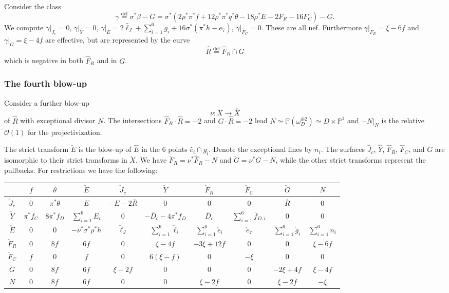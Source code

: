 \documentclass[12pt]{amsart}
\theoremstyle{definition}
\newcommand{\bb}{\ensuremath{\mathfrak{b}}}
\newcommand{\deq}{\ensuremath{\stackrel{\textrm{def}}{=}}}
\newcommand{\?}{ \circled{{\large\bf ?}}}
\let\cal\mathcal
\let\bb\mathbb
\begin{document}
Consider the class
\[\gamma\deq \sigma^*\beta-G= \sigma^*(2\rho^*\pi^*f+12\rho^*\pi^*q^*\theta-18\rho^*E-2F_R-16F_C)-G.\]
We compute $\gamma|_{\widehat J_c}=0$, $\gamma|_{\widehat Y}=0$, $\gamma|_{\widehat E}=2\widehat{\ell}_J+\sum_{i=1}^6g_i+16\sigma^*(\pi^*h-e_7)$, $\gamma|_{\widehat F_C}=0$. These are all nef. Furthermore $\gamma|_{\widehat F_R}=\xi-6f$ and $\gamma|_{G}=\xi-4f$ are effective, but are represented by the curve 
\[\widehat R\deq\widehat F_R\cap G\]
which is negative in both $\widehat F_R$ and in $G$. 

\subsubsection{The fourth blow-up}Consider a further blow-up
\[\nu:\check{X}\to\widehat{X}\]
of $\widehat R$ with exceptional divisor $N$. The intersections $\widehat F_R\cdot\widehat R=-2$ and $G\cdot\widehat R=-2$ lead $N\simeq\bb P(\omega_D^{\oplus 2})\simeq D\times\bb P^1$ and $-N|_N$ is the relative $\cal O(1)$ for the projectivization. 

The strict transform $\check E$ is the blow-up of $\widehat E$ in the 6 points $\widehat e_i\cap g_i$. Denote the exceptional lines by $n_i$. The surfaces $\widehat J_c$, $\widehat Y$, $\widehat F_R$, $\widehat F_C$, and $G$ are isomorphic to their strict transforms in $\check X$. We have $\check F_R=\nu^*\widehat F_R-N$ and $\check G=\nu^*G-N$, while the other strict transforms represent the pullbacks. For restrictions we have the following:

\begin{center}
	\begin{tabular}{|c|c|c|c|c|c|c|c|c|c|}
		\hline 
		& $f$& $\theta$& $\check E$& $\check J_c$ & $\check Y$ & $\check F_R$& $\check F_C$& $\check G$& $N$\\
		\hline\hline 
		$\check J_c$ & $0$ & $\pi^*\theta$  & $E$ & $-E-2\overline R$ & $0$ & $0$ & $0$ & $\overline R$ & $0$ \\
		\hline 
		$\check Y$ & $\pi^*f_C$ & $8\pi^*f_D$ & $\sum_{i=1}^6E_i$ & $0$ & $-\overline D_c-4\pi^*f_D$ & $\overline D_c$ & $\sum_{i=1}^6\overline f_{D,i}$ & $0$ & $0$ \\
		\hline 
		$\check E$ & $0$ & $0$ & $-\nu^*\sigma^*\rho^*h$ & $\check{\ell}_J$ & $\sum_{i=1}^6\check{\ell}_i$ & $\sum_{i=1}^6\check e_i$ & $\check e_7$ & $\sum_{i=1}^6\check g_i$ & $\sum_{i=1}^6n_i$\\
		\hline 
		$\check F_R$ & $0$  & $8f$ & $6f$ & $0$ & $\xi-4f$ & $-3\xi+12f$ & $0$ & $0$& $\xi-6f$\\ 
		\hline 
		$\check F_C$ & $f$ & $0$ & $f$ & $0$ & $6(\xi-f)$ & $0$ & $-\xi$ & $0$& $0$	\\
		\hline 	 
		$\check G$ & $0$ & $8f$ & $6f$ & $\xi-2f$ & $0$ & $0$ & $0$ & $-2\xi+4f$& $\xi-4f$\\
		\hline 
		$N$& $0$ &  $8f$ & $6f$ & $0$ & $0$ & $\xi-2f$& $0$& $\xi-2f$& $-\xi$\\
		\hline
	\end{tabular}
\end{center}
\end{document}
